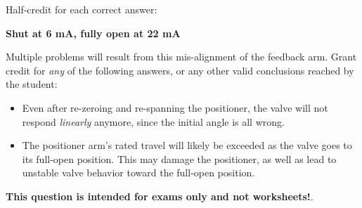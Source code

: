 





Half-credit for each correct answer:

\vskip 10pt

\itemitem{} {\bf Shut at 6 mA, fully open at 22 mA}

\vskip 10pt

Multiple problems will result from this mis-alignment of the feedback arm.  Grant credit for {\it any} of the following answers, or any other valid conclusions reached by the student:

\begin{itemize}
\item{} Even after re-zeroing and re-spanning the positioner, the valve will not respond {\it linearly} anymore, since the initial angle is all wrong.
\item{} The positioner arm's rated travel will likely be exceeded as the valve goes to its full-open position.  This may damage the positioner, as well as lead to unstable valve behavior toward the full-open position.
\end{itemize}








{\bf This question is intended for exams only and not worksheets!}.



